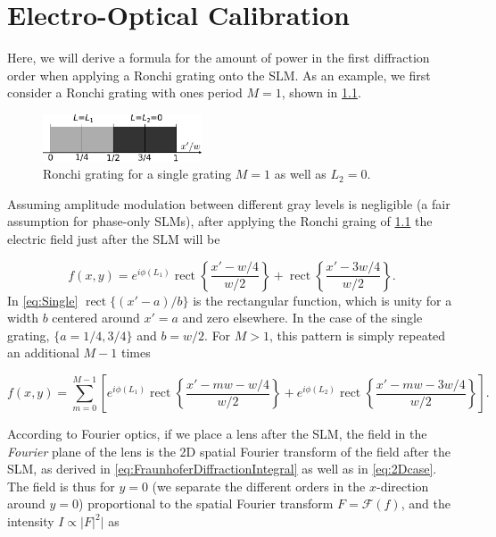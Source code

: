 \chapter{Electro-Optical Calibration}\label{ch:ElectroOptical}

Here, we will derive a formula for the amount of power in the first diffraction order when applying a Ronchi grating onto the SLM.
As an example, we first consider a Ronchi grating with ones period $M=1$, shown in \cref{fig:OneGrating}.

\begin{figure}[h]
    \centering
    \includegraphics[width=0.42\textwidth]{figures/OneGrating.pdf}
    \caption{Ronchi grating for a single grating $M=1$ as well as $L_2=0$.}
    \label{fig:OneGrating}
\end{figure}

\noindent Assuming amplitude modulation between different gray levels is negligible (a fair assumption for phase-only SLMs), after applying the Ronchi graing of \cref{fig:OneGrating} the electric field just after the SLM will be

\begin{equation}\label{eq:Single}
    f(x,y) = e^{i\phi(L_1)} \operatorname{rect} \left\{ 
    \frac{x'-w/4}{w/2}\right\} +
    \operatorname{rect}\left\{ \frac{x'-3w/4}{w/2}\right\}.
\end{equation}
In \cref{eq:Single} $\operatorname{rect}\{(x'-a)/b\}$ is the rectangular function, which is unity for a width $b$ centered around $x'=a$ and zero elsewhere.
In the case of the single grating, $\{a=1/4, 3/4\}$ and $b=w/2$.
For $M>1$, this pattern is simply repeated an additional $M-1$ times \cite{Zhang1994}

\begin{equation}\label{eq:FieldAfterSLM}
    f(x,y) = \sum_{m=0}^{M-1} \left[
    e^{i \phi(L_1)} \operatorname{rect}\left\{\frac{x'-m w - w/4}{w/2}\right\} + 
    e^{i \phi(L_2)}\operatorname{rect}\left\{\frac{x'- m w - 3 w/4}{w/2}\right\}
    \right].
\end{equation}

\noindent According to Fourier optics, if we place a lens after the SLM, the field in the \textit{Fourier} plane of the lens is the 2D spatial Fourier transform of the field after the SLM, as derived in \cref{eq:FraunhoferDiffractionIntegral} as well as in \cref{eq:2Dcase}.
The field is thus for $y=0$ (we separate the different orders in the $x$-direction around $y=0$) proportional to the spatial Fourier transform $F = \mathcal{F}(f)$, and the intensity $I\propto |F|^2|$ as \cite{Zhang1994}

